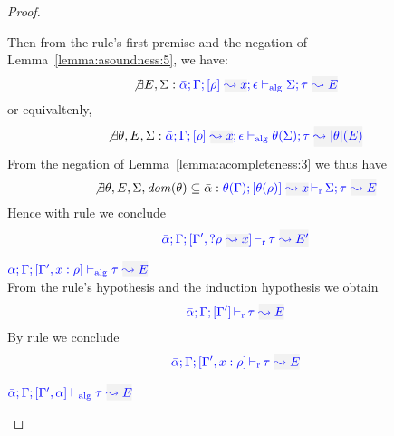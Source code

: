 \begin{proof}
\begin{description}
  Then from the rule's first premise and the negation of Lemma~\ref{lemma:asoundness:5}, we have:
\begin{equation*}
\not\exists E, \Sigma:
\admres{\bar\alpha}{\tenv}{\rulet}{x}{\epsilon}{\type}{E}{\Sigma}
\end{equation*}
or equivaltenly,
\begin{equation*}
\not\exists \theta, E, \Sigma:
\admres{\bar\alpha}{\tenv}{\rulet}{x}{\epsilon}{\type}{\etrans{\theta}(E)}{\theta(\Sigma)}
\end{equation*}
From the negation of Lemma~\ref{lemma:acompleteness:3} we thus have
\begin{equation*}
\not\exists \theta, E, \Sigma, \dom(\theta) \subseteq \bar{\alpha}:
\dmres{\theta(\tenv)}{\theta(\rulet)}{x}{\type}{E}{\Sigma}
\end{equation*}
  Hence with rule  we conclude
\begin{equation*}
   \dlres{\bar\alpha}{\tenv}{\tenv',\envi{\rulet}{x}}{\type}{E'}
\end{equation*}

\item[\fbox{\rref{Alg-L-Var}}]\quad
$\adlres{\bar\alpha}{\tenv}{\tenv',\relation{x}{\rulet}}{\type}{E}$\ \\

From the rule's hypothesis and the induction hypothesis we obtain
\begin{equation*}
  \dlres{\bar\alpha}{\tenv}{\tenv'}{\type}{E}
\end{equation*}
By rule  we conclude
\begin{equation*}
  \dlres{\bar\alpha}{\tenv}{\tenv',\relation{x}{\rulet}}{\type}{E}
\end{equation*}

\item[\fbox{\rref{Alg-L-TyVar}}]\quad
$\adlres{\bar{\alpha}}{\tenv}{\tenv',\alpha}{\type}{E}$ \ \\


\end{description}
\end{proof}
